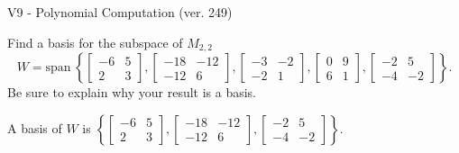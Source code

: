 \begin{exercise}
  \begin{exerciseTitle}V9 - Polynomial Computation (ver. 249)\end{exerciseTitle}
  \begin{exerciseStatement}
    Find a basis for the subspace of \(M_{2,2}\) 
\[W=\mathrm{span}\ \left\{\left[\begin{array}{cc}
-6 & 5 \\
2 & 3
\end{array}\right] , \left[\begin{array}{cc}
-18 & -12 \\
-12 & 6
\end{array}\right] , \left[\begin{array}{cc}
-3 & -2 \\
-2 & 1
\end{array}\right] , \left[\begin{array}{cc}
0 & 9 \\
6 & 1
\end{array}\right] , \left[\begin{array}{cc}
-2 & 5 \\
-4 & -2
\end{array}\right]\right\}.\]
 Be sure to explain why your result is a basis.


  \end{exerciseStatement}
  \begin{exerciseAnswer}
   A basis of \(W\) is  \(\left\{\left[\begin{array}{cc}
-6 & 5 \\
2 & 3
\end{array}\right] , \left[\begin{array}{cc}
-18 & -12 \\
-12 & 6
\end{array}\right] , \left[\begin{array}{cc}
-2 & 5 \\
-4 & -2
\end{array}\right]\right\}\).
  


  \end{exerciseAnswer}
\end{exercise}
